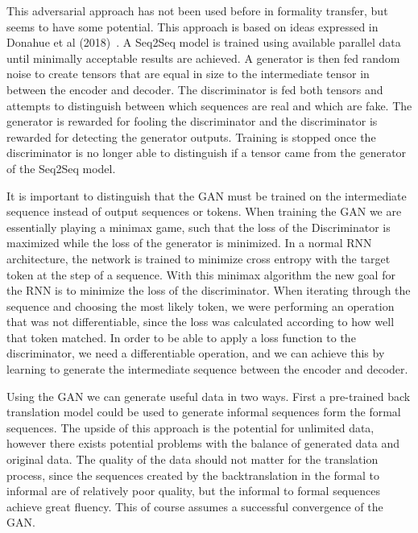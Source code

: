 \documentclass[12pt]{article}
\begin{document}
This adversarial approach has not been used before in formality transfer, but seems 
to have some potential. This approach is based on ideas expressed in 
Donahue et al (2018)~\cite{ganpaper}. A Seq2Seq model is trained 
using available parallel data until minimally acceptable results are achieved.
A generator is then fed random noise to create tensors that are equal in size to the 
intermediate tensor in between the encoder and decoder. The discriminator is fed both 
tensors and attempts to distinguish between which sequences are real and which are fake. 
The generator is rewarded for fooling the discriminator and the discriminator is rewarded
for detecting the generator outputs. Training is stopped once the discriminator is no 
longer able to distinguish if a tensor came from the generator of the Seq2Seq model. \par 

It is important to distinguish that the GAN must be trained on the intermediate sequence
instead of output sequences or tokens. When training the GAN we are essentially playing a 
minimax game, such that the loss of the Discriminator is maximized while the loss of the
generator is minimized. In a normal RNN architecture, the network is trained to minimize 
cross entropy with the target token at the step of a sequence. With this minimax algorithm 
the new goal for the RNN is to minimize the loss of the discriminator. When iterating 
through the sequence and choosing the most likely token, we were performing an operation 
that was not differentiable, since the loss was calculated according to how well that token
matched. In order to be able to apply a loss function to the discriminator, we need a 
differentiable operation, and we can achieve this by learning to generate the intermediate
sequence between the encoder and decoder.  


Using the GAN we can generate useful data in two ways. First a pre-trained
back translation model could be used to generate informal sequences form the 
formal sequences. The upside of this approach is the potential for unlimited data, however
there exists potential problems with the balance of generated data and original data. 
The quality of the data should not matter for the translation process, since the sequences
created by the backtranslation in the formal to informal are of relatively poor quality, but
the informal to formal sequences achieve great fluency. This of course assumes a successful 
convergence of the GAN. \par
\end{document}

